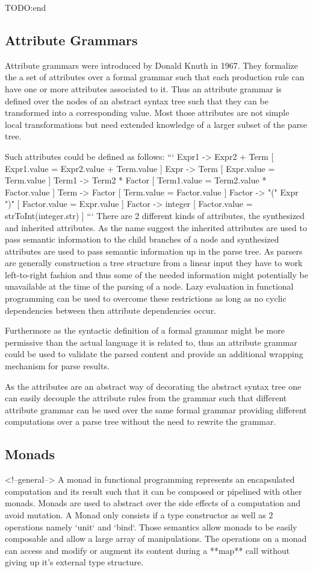 TODO:end

\subsection{Attribute Grammars}
Attribute grammars were introduced by Donald Knuth in 1967. They formalize the a set of attributes over a formal grammar such that each production rule can have one or more attributes associated to it. Thus an attribute grammar is defined over the nodes of an abstract syntax tree such that they can be transformed into a corresponding value. Most those attributes are not simple local transformations but need extended knowledge of a larger subset of the parse tree.

Such attributes could be defined as follows:
```
Expr1 -> Expr2 + Term    [ Expr1.value = Expr2.value + Term.value ]
Expr -> Term             [ Expr.value = Term.value ]
Term1 -> Term2 * Factor  [ Term1.value = Term2.value * Factor.value ]
Term -> Factor           [ Term.value = Factor.value ]
Factor -> "(" Expr ")"   [ Factor.value =  Expr.value ]
Factor -> integer        [ Factor.value = strToInt(integer.str) ]
```
There are 2 different kinds of attributes, the synthesized and inherited attributes. As the name suggest the inherited attributes are used to pass semantic information to the child branches of a node and synthesized attributes are used to pass semantic information up in the parse tree. As parsers are generally construction a tree structure from a linear input they have to work left-to-right fashion and thus some of the needed information might potentially be unavailable at the time of the parsing of a node. Lazy evaluation in functional programming can be used to overcome these restrictions as long as no cyclic dependencies between then attribute dependencies occur.

Furthermore as the syntactic definition of a formal grammar might be more permissive than the actual language it is related to, thus an attribute grammar could be used to validate the parsed content and provide an additional wrapping mechanism for parse results. 

As the attributes are an abstract way of decorating the abstract syntax tree one can easily decouple the attribute rules from the grammar such that different attribute grammar can be used over the same formal grammar providing different computations over a parse tree without the need to rewrite the grammar.

\subsection{Monads}
<!--general-->
A monad in functional programming represents an encapsulated computation and its result such that it can be composed or pipelined with other monads. Monads are used to abstract over the side effects of a computation and avoid mutation. A Monad only consists if a type constructor as well as 2 operations namely `unit` and `bind`. Those semantics allow monads to be easily composable and allow a large array of manipulations. The operations on a monad can access and modify or augment its content during a **map** call without giving up it's external type structure.
 
